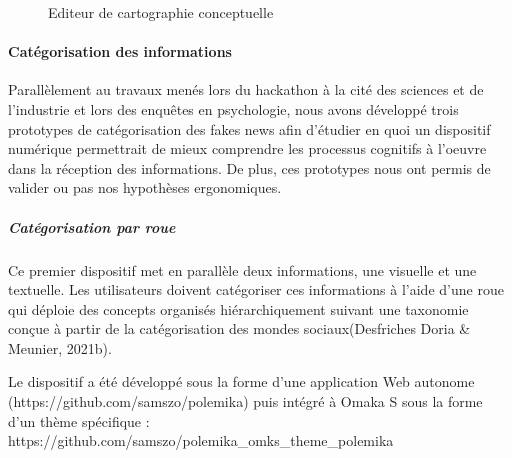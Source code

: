 \documentclass[
  a4paper,
  DIV=11,
  numbers=noendperiod]{scrreprt}
\let\oldparagraph\paragraph
\renewcommand{\paragraph}[1]{\oldparagraph{#1}\mbox{}}
\let\oldsubparagraph\subparagraph
\renewcommand{\subparagraph}[1]{\oldsubparagraph{#1}\mbox{}}
\begin{document}
\begin{figure}


\caption{\label{fig-polemikaEditor}Editeur de cartographie conceptuelle}

\end{figure}%

\paragraph{Catégorisation des
informations}\label{catuxe9gorisation-des-informations}

Parallèlement au travaux menés lors du hackathon à la cité des sciences
et de l'industrie et lors des enquêtes en psychologie, nous avons
développé trois prototypes de catégorisation des fakes news afin
d'étudier en quoi un dispositif numérique permettrait de mieux
comprendre les processus cognitifs à l'oeuvre dans la réception des
informations. De plus, ces prototypes nous ont permis de valider ou pas
nos hypothèses ergonomiques.

\subparagraph{Catégorisation par roue}\label{catuxe9gorisation-par-roue}

Ce premier dispositif met en parallèle deux informations, une visuelle
et une textuelle. Les utilisateurs doivent catégoriser ces informations
à l'aide d'une roue qui déploie des concepts organisés hiérarchiquement
suivant une taxonomie conçue à partir de la catégorisation des mondes
sociaux(Desfriches Doria \& Meunier, 2021b).

Le dispositif a été développé sous la forme d'une application Web
autonome (https://github.com/samszo/polemika) puis intégré à Omaka S
sous la forme d'un thème spécifique :
https://github.com/samszo/polemika\_omks\_theme\_polemika
\end{document}
